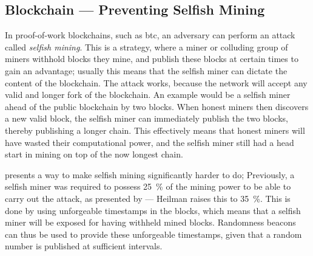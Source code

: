 \subsection{Blockchain --- Preventing Selfish Mining}\label{sub:blockchain_preventing_selfish_mining}
In proof-of-work blockchains, such as \gls{btc}, an adversary can perform an attack called \emph{selfish mining}.
This is a strategy, where a miner or colluding group of miners withhold blocks they mine, and publish these blocks at certain times to gain an advantage;
usually this means that the selfish miner can dictate the content of the blockchain.
The attack works, because the network will accept any valid and longer fork of the blockchain.
An example would be a selfish miner ahead of the public blockchain by two blocks.
When honest miners then discovers a new valid block, the selfish miner can immediately publish the two blocks, thereby publishing a longer chain.
This effectively means that honest miners will have wasted their computational power, and the selfish miner still had a head start in mining on top of the now longest chain.

\citet{heilman2014one} presents a way to make selfish mining significantly harder to do;
Previously, a selfish miner was required to possess 25~\% of the mining power to be able to carry out the attack, as presented by \citet{eyal2014majority} --- Heilman raises this to 35~\%.
This is done by using unforgeable timestamps in the blocks, which means that a selfish miner will be exposed for having withheld mined blocks.
Randomness beacons can thus be used to provide these unforgeable timestamps, given that a random number is published at sufficient intervals.
